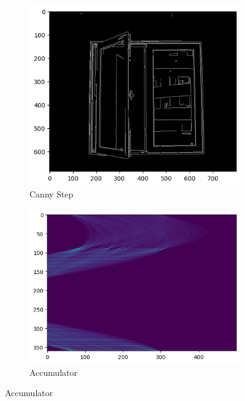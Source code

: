 \documentclass{article}
\begin{document}
    \begin{figure}
        \centering
        \begin{subfigure}[b]{0.7\linewidth}
            \includegraphics[width = \linewidth]{fig18a.png}
            \caption{Canny Step}
        \end{subfigure}

        \begin{subfigure}[b]{0.7\linewidth}
            \includegraphics[width = \linewidth]{fig18b.png}
            \caption{Accumulator}
        \end{subfigure}


\end{figure}
\end{document}

